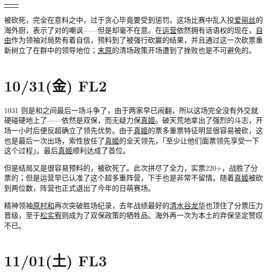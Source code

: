 \begin{tabular}{lr}
{\begin{minipage}{.4\textwidth}
\end{minipage}}
\end{tabular}
\CTEXindent

被砍死，完全在意料之中，过于贪心毕竟要受到惩罚。这场比赛中乱入投\uline{爱丽丝}的海外厨，表示了对的嘲讽——但是却毫不在意。在\uline{运营}依然拥有话语权的现在，\uline{自由}作为领袖对局势有着自信，预料到了被强行砍赢的结果，并且通过这一次砍票重新树立了在群中的领导地位；\uline{末原}的清场政策开场遭到了挫败也是不可避免的。

\section{10/31(金) FL2}


1031 则是和之间最后一场斗争了，由于两家早已闹翻，所以这场完全没有外交就硬碰硬地上了——依然是双保，而无疑力保\uline{真姬}。破天荒地拿出了强烈的斗志，开场一小时后便反超确立了领先优势。由于\uline{真姬}的票多重票特征明显很容易被砍，这也是最后一次出场，索性放任了\uline{真姬}的全天领先，「至少让他们面票领先享受一下这个过程」。最后\uline{真姬}顺利达成了首位。

但是结局又是很容易预料的，被砍死了。此次拼尽了全力，实票220+，战胜了分票的；但是运营早已认准了这个超多重阵营，下手也是非常不留情。随着\uline{真姬}被砍到两位数，阵营也正式退出了今年的日萌赛场。

精神领袖\uline{原村和}再次突破胜场纪录，去年战绩最好的\uline{清水谷龙华}也顶住了分票压力晋级，至于\uline{松实宥}则成为了双保政策的牺牲品。海外再一次为本土的弃保坚定赞叹不已。

\section{11/01(土) FL3}

